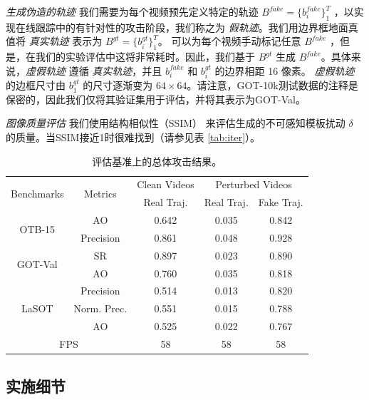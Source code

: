 \textit{生成伪造的轨迹} 我们需要为每个视频预先定义特定的轨迹 $B^{fake}=\{b^{fake}_i\}_1^{T}$ ，以实现在线跟踪中的有针对性的攻击阶段，我们称之为 \textit{假轨迹}。我们用边界框地面真值将 \textit{真实轨迹} 表示为 $B^{gt}=\{b^{gt}_i\}_1^T$。
可以为每个视频手动标记任意 $B^{fake}$ ，但是，在我们的实验评估中这将非常耗时。因此，我们基于 $B^{gt}$ 生成 $B^{fake}$。具体来说，\textit{虚假轨迹} 遵循 \textit{真实轨迹}，并且 $b^{fake}_i$ 和 $b^{gt}_i$ 的边界相距 16 像素。
\textit{虚假轨迹} 的边框尺寸由 $b^{gt}_1$ 的尺寸逐渐变为 $64\times 64$。请注意，GOT-10k测试数据的注释是保密的，因此我们仅将其验证集用于评估，并将其表示为GOT-Val。

\textit{图像质量评估} 我们使用结构相似性（SSIM）\cite{SSIM} 来评估生成的不可感知模板扰动 $\delta$ 的质量。当SSIM接近1时很难找到（请参见表 \ref{tab:iter}）。

\begin{table}
\centering
\footnotesize
\tabcolsep=2.0pt
\begin{tabular}{c c | c | c | c}
\toprule
\multirow{2}{*}[-2pt]{Benchmarks} & \multirow{2}{*}[-2pt]{Metrics} & Clean Videos    & \multicolumn{2}{c}{Perturbed Videos}  \\
\cmidrule{3-5}
                          &                         & Real Traj. & Real Traj. & Fake Traj.     \\ 
\midrule
\multirow{2}{*}{OTB-15} 
& AO   & 0.642 & 0.035 & 0.842\\
& Precision & 0.861 & 0.048 & 0.928\\
\midrule
\multirow{2}{*}{GOT-Val} 
& SR & 0.897 & 0.023 & 0.890\\
& AO 				   & 0.760 & 0.035 & 0.818 \\
\midrule
\multirow{3}{*}{LaSOT} 
& Precision       & 0.514 & 0.013 & 0.820\\
& Norm. Prec. & 0.551 & 0.015 & 0.788\\
& AO & 0.525 & 0.022 & 0.767\\
\midrule
\multicolumn{2}{c|}{FPS} & 58 & 58 & 58\\
\bottomrule
\end{tabular}
\caption{评估基准上的总体攻击结果。}
\label{tab:benchmark results}
\end{table}

\subsection{实施细节}

